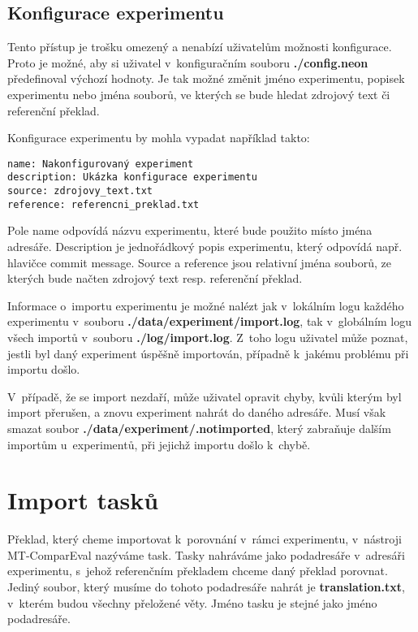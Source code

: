 \subsection{Konfigurace experimentu}
Tento přístup je trošku omezený a nenabízí uživatelům možnosti konfigurace.
Proto je možné,
  aby si uživatel v~konfiguračním souboru \textbf{./config.neon} předefinoval výchozí hodnoty.
Je tak možné změnit jméno experimentu, popisek experimentu nebo jména souborů,
  ve kterých se bude hledat zdrojový text či referenční překlad.

Konfigurace experimentu by mohla vypadat například takto: \\

\begin{verbatim}
name: Nakonfigurovaný experiment
description: Ukázka konfigurace experimentu
source: zdrojovy_text.txt
reference: referencni_preklad.txt
\end{verbatim}

Pole name odpovídá názvu experimentu, které bude použito místo jména adresáře.
Description je jednořádkový popis experimentu,
  který odpovídá např. hlavičce commit message.
Source a reference jsou relativní jména souborů,
  ze kterých bude načten zdrojový text resp. referenční překlad.

Informace o~importu experimentu je možné nalézt
  jak v~lokálním logu každého experimentu v~souboru \textbf{./data/experiment/import.log},
  tak v~globálním logu všech importů v~souboru \textbf{./log/import.log}.
Z~toho logu uživatel může poznat,
  jestli byl daný experiment úspěšně importován,
  případně k~jakému problému při importu došlo.

V~případě, že se import nezdaří,
  může uživatel opravit chyby,
  kvůli kterým byl import přerušen,
  a znovu experiment nahrát do daného adresáře.
Musí však smazat soubor \textbf{./data/experiment/.notimported},
  který zabraňuje dalším importům u~experimentů,
  při jejichž importu došlo k~chybě.


\section{Import tasků}
Překlad,
  který cheme importovat k~porovnání v~rámci experimentu,
  v~nástroji MT-ComparEval nazýváme task.
Tasky nahráváme jako podadresáře v~adresáři experimentu,
  s~jehož referenčním překladem chceme daný překlad porovnat.
Jediný soubor, který musíme do tohoto podadresáře nahrát je \textbf{translation.txt},
  v~kterém budou všechny přeložené věty.
Jméno tasku je stejné jako jméno podadresáře.

